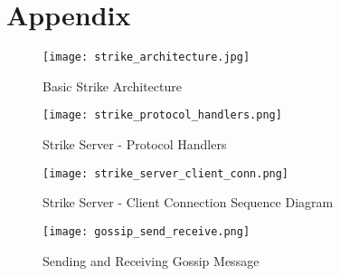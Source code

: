 \documentclass[dareport.tex]{subfiles}
\begin{document}
\section{Appendix}


\begin{figure}[h]
\texttt{[image: strike\_architecture.jpg]}
\centering
\caption{Basic Strike Architecture}
\label{fig:strike_arch}
\centering
\end{figure}




\begin{figure}[h]
\texttt{[image: strike\_protocol\_handlers.png]}
\centering
\caption{Strike Server - Protocol Handlers}
\label{fig:protohdl}
\centering
\end{figure}

\begin{figure}[h]
\texttt{[image: strike\_server\_client\_conn.png]}
\caption{Strike Server - Client Connection Sequence Diagram}
\label{fig:clientsq}
\centering
\end{figure}

\begin{figure}[h]
\texttt{[image: gossip\_send\_receive.png]}
\centering
\caption{Sending and Receiving Gossip Message}
\label{fig:send_receive_gmsg}
\centering
\end{figure}
\end{document}
